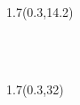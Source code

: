 \begingroup

\textblockorigin{0mm}{0mm}

\begin{textblock*}{1.7\TPHorizModule}(0.3\TPHorizModule,14.2\TPVertModule)
  \begin{minipage}{\linewidth}
    \thetitle \\
    \vspace*{20mm}
    \theauthor \\
  \end{minipage}
\end{textblock*}

\begin{textblock*}{1.7\TPHorizModule}(0.3\TPHorizModule,32\TPVertModule)
  \begin{minipage}{\linewidth}
    \thedate
  \end{minipage}
\end{textblock*}


\endgroup

